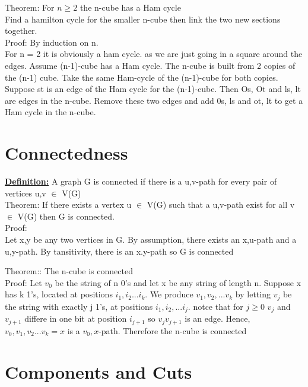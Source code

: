 \documentclass[12pt]{article}
\newcommand{\myt}[1]{\textbf{\underline{#1}}}
\begin{document}
	Theorem: For $n \geq 2$ the n-cube has a Ham cycle\\
	
	Find a hamilton cycle for the smaller n-cube then link the two new sections together.\\
	
	Proof: By induction on n.\\
	
	For n = 2 it is obviously a ham cycle. as we are just going in a square around the edges. Assume (n-1)-cube has a Ham cycle. The n-cube is built from 2 copies of the (n-1) cube. Take the same Ham-cycle of the (n-1)-cube for both copies. Suppose st is an edge of the Ham cycle for the (n-1)-cube. Then Os, Ot and ls, lt are edges in the n-cube. Remove these two edges and add 0s, ls and ot, lt to get a Ham cycle in the n-cube.\\
	
	\section*{Connectedness}
	
	\myt{Definition:} A graph G is connected if there is a u,v-path for every pair of vertices u,v $\in$ V(G)\\
	
	Theorem: If there exists a vertex u $\in$ V(G) such that a u,v-path exist for all v $\in$ V(G) then G is connected.\\
	
	Proof: \\
	
	Let x,y be any two vertices in G. By assumption, there exists an x,u-path and a u,y-path. By tansitivity, there is an x.y-path so G is connected\
	
	Theorem:: The n-cube is connected\\
	
	Proof: Let $v_0$ be the string of n 0's and let x be any string of length n. Suppose x has k 1's, located at positions $i_1, i_2 ... i_k$. We produce $v_1, v_2, ... v_k$ by letting $v_j$ be the string with exactly j 1's, at positions $i_1, i_2, ... i_j.$ notce that for $j \geq 0$ $v_j$ and $v_{j+1}$ differe in one bit at position $i_{j+1}$ so $v_jv_{j+1}$ is an edge. Hence, $v_0, v_1, v_2...v_k = x$ is a $v_0,x$-path. Therefore the n-cube is connected\\
	
	\section*{Components and Cuts}
	
\end{document}
